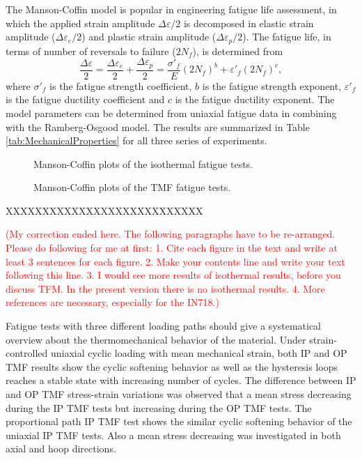 \documentclass[preprint,5p,twocolumn,11pt,sort&compress]{elsarticle}
\newcommand{\marked}[1]{\textcolor{red}{#1}}
\begin{document}
The Manson-Coffin model is popular in engineering fatigue life assessment, in which the applied strain amplitude $\Delta \varepsilon/2$ is decomposed in elastic strain amplitude ($\Delta \varepsilon_e/2$) and plastic strain amplitude ($\Delta \varepsilon_p/2$). The fatigue life, in terms of number of reversals to failure ($2N_f$), is determined from
\begin{equation}
\frac{{\Delta \varepsilon }}{2} = \frac{{\Delta {\varepsilon _e}}}{2} + \frac{{\Delta {\varepsilon _p}}}{2} = \frac{{{{\sigma '}_f}}}{E}{\left( {2{N_f}} \right)^b} + {\varepsilon '_f}{\left( {2{N_f}} \right)^c},
\label{Equ:CoffinManson}
\end{equation}
where ${{{\sigma '}_f}}$ is the fatigue strength coefficient, $b$ is the fatigue strength exponent, ${{{\varepsilon '}_f}}$ is the fatigue ductility coefficient and $c$ is the fatigue ductility exponent. The model parameters can be determined from uniaxial fatigue data in combining with the Ramberg-Osgood model. The results are summarized in Table \ref{tab:MechanicalProperties} for all three series of experiments.

\begin{figure}[!htp]
\caption{Manson-Coffin plots of the isothermal fatigue tests.}
\label{Fig:Baseline}
\end{figure}

\begin{figure}[!htp]
\caption{Manson-Coffin plots of the TMF fatigue tests.}
\label{Fig:plot_exp_fatigue_life}
\end{figure}

XXXXXXXXXXXXXXXXXXXXXXXXXXX

\marked{(My correction ended here. The following paragraphs have to be re-arranged. Please do following for me at first:
1. Cite each figure in the text and write at least 3 sentences for each figure. 2. Make your contents line and write your text following this line. 3. I would see more results of isothermal results, before you discuss TFM. In the present version there is no isothermal results. 4. More references are necessary, especially for the IN718.)}


Fatigue tests with three different loading paths should give a systematical overview about the thermomechanical behavior of the material. Under strain-controlled uniaxial cyclic loading with mean mechanical strain, both IP and OP TMF results show the cyclic softening behavior as well as the hysteresis loops reaches a stable state with increasing number of cycles. The difference between IP and OP TMF stress-strain variations was observed that a mean stress decreasing during the IP TMF tests but increasing during the OP TMF tests. The proportional path IP TMF test shows the similar cyclic softening behavior of the uniaxial IP TMF tests. Also a mean stress decreasing was investigated in both axial and hoop directions.
\end{document}
